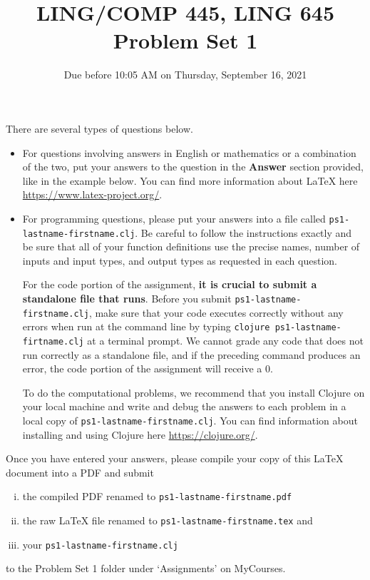 \documentclass[10pt]{article}
\newcommand{\PSnum}{1}
\begin{document}
\title{LING/COMP 445, LING 645\\Problem Set \PSnum}
\date{Due before 10:05 AM on Thursday, September 16, 2021}
\maketitle

There are several types of questions below.
\begin{itemize}
  \item
    For questions involving answers in English or mathematics or a
    combination of the two, put your answers to the question in the
    \textbf{Answer} section provided, like in the example below.
    You can find more information about \LaTeX{} here
    \url{https://www.latex-project.org/}.

  \item For programming questions,
    please put your answers into a file called
    \texttt{ps\PSnum-lastname-firstname.clj}. Be careful to follow the instructions
    exactly and be sure that all of your function definitions use the
    precise names, number of inputs and input types, and output types as
    requested in each question.

    For the code portion of the assignment, \textbf{it is crucial to submit a
    standalone file that runs}. Before you submit
    \texttt{ps\PSnum-lastname-firstname.clj},
    make sure that your code executes correctly without any errors
    when run at the command line by typing
    \texttt{clojure ps\PSnum-lastname-firtname.clj} at a terminal
    prompt. We cannot grade any code that does not run correctly as a
    standalone file, and if the preceding command produces an error,
    the code portion of the assignment will receive a $0$.

    To do the computational problems, we recommend that you install
    Clojure on your local machine and write and debug the answers to each
    problem in a local copy of \texttt{ps\PSnum-lastname-firstname.clj}. You can
    find information about installing and using Clojure here
    \url{https://clojure.org/}.
\end{itemize}
Once you have entered your answers, please compile your copy of this
\LaTeX{} document into a PDF and submit
\begin{enumerate}[(i),noitemsep]
  \item
    the compiled PDF renamed to
    \texttt{ps\PSnum-lastname-firstname.pdf}
  \item
    the raw \LaTeX{} file renamed to
    \texttt{ps\PSnum-lastname-firstname.tex} and
  \item
    your \texttt{ps\PSnum-lastname-firstname.clj}
\end{enumerate}
to the Problem Set \PSnum{} folder under `Assignments' on MyCourses.
\end{document}
